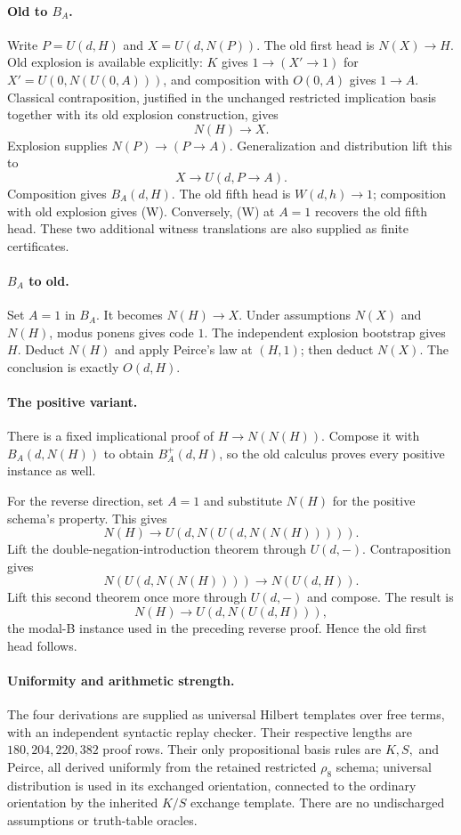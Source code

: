 \paragraph{Old to $B_A$.}
Write $P=U(d,H)$ and $X=U(d,N(P))$.
The old first head is $N(X)\to H$. Old explosion is available
explicitly: $K$ gives $1\to (X'\to1)$ for
$X'=U(0,N(U(0,A)))$, and composition with $O(0,A)$ gives $1\to A$.
Classical contraposition, justified
in the unchanged restricted implication basis together with its old
explosion construction, gives
\[
 N(H)\to X.
\]
Explosion supplies $N(P)\to(P\to A)$. Generalization and distribution
lift this to
\[
 X\to U(d,P\to A).
\]
Composition gives $B_A(d,H)$. The old fifth head is $W(d,h)\to1$;
composition with old explosion gives (W). Conversely, (W) at $A=1$
recovers the old fifth head. These two additional witness translations are
also supplied as finite certificates.

\paragraph{$B_A$ to old.}
Set $A=1$ in $B_A$. It becomes $N(H)\to X$. Under assumptions
$N(X)$ and $N(H)$, modus ponens gives code $1$. The independent
explosion bootstrap gives $H$. Deduct $N(H)$ and apply Peirce's law
at $(H,1)$; then deduct $N(X)$. The conclusion is exactly $O(d,H)$.

\paragraph{The positive variant.}
There is a fixed implicational proof of $H\to N(N(H))$. Compose it
with $B_A(d,N(H))$ to obtain $B_A^+(d,H)$, so the old calculus proves
every positive instance as well.

For the reverse direction, set $A=1$ and substitute $N(H)$ for the
positive schema's property. This gives
\[
 N(H)\to U(d,N(U(d,N(N(H))))).
\]
Lift the double-negation-introduction theorem through $U(d,-)$.
Contraposition gives
\[
 N(U(d,N(N(H))))\to N(U(d,H)).
\]
Lift this second theorem once more through $U(d,-)$ and compose.
The result is
\[
 N(H)\to U(d,N(U(d,H))),
\]
the modal-B instance used in
the preceding reverse proof. Hence the old first head follows.

\paragraph{Uniformity and arithmetic strength.}
The four derivations are supplied as universal Hilbert templates over
free terms, with an independent syntactic replay checker. Their respective
lengths are $180,204,220,382$ proof rows. Their only propositional basis
rules are $K,S,$ and Peirce, all derived uniformly from the retained
restricted $\rho_8$ schema; universal distribution is used in its exchanged
orientation, connected to the ordinary orientation by the inherited
$K/S$ exchange template. There are no undischarged assumptions or
truth-table oracles.

